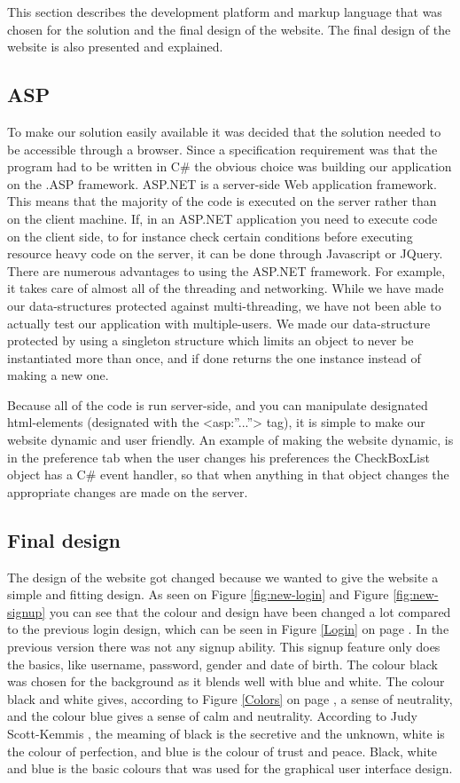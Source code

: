 This section describes the development platform and markup language that was chosen for the solution and the final design of the website. The final design of the website is also presented and explained.

\subsection{ASP}
To make our solution easily available it was decided that the solution needed to be accessible through a browser. Since a specification requirement was that the program had to be written in C\# the obvious choice was building our application on the .ASP framework. ASP.NET is a server-side Web application framework. This means that the majority of the code is executed on the server rather than on the client machine. If, in an ASP.NET application you need to execute code on the client side, to for instance check certain conditions before executing resource heavy code on the server, it can be done through Javascript or JQuery. There are numerous advantages to using the ASP.NET framework. For example, it takes care of almost all of the threading and networking. While we have made our data-structures protected against multi-threading, we have not been able to actually test our application with multiple-users. We made our data-structure protected by using a singleton structure which limits an object to never be instantiated more than once, and if done returns the one instance instead of making a new one.

Because all of the code is run server-side, and you can manipulate designated html-elements  (designated with the <asp:”...”> tag), it is simple to make our website dynamic and user friendly. An example of making the website dynamic, is in the preference tab when the user changes his preferences the CheckBoxList object has a C\# event handler, so that when anything in that object changes the appropriate changes are made on the server.

\subsection{Final design}
The design of the website got changed because we wanted to give the website a simple and fitting design. As seen on Figure \ref{fig:new-login} and Figure \ref{fig:new-signup} you can see that the colour and design have been changed a lot compared to the previous login design, which can be seen in Figure \ref{Login} on page \pageref{Login}. In the previous version there was not any signup ability. This signup feature only does the basics, like username, password, gender and date of birth. The colour black was chosen for the background as it blends well with blue and white. The colour black and white gives, according to Figure \ref{Colors} on page \pageref{Colors}, a sense of neutrality, and the colour blue gives a sense of calm and neutrality. According to Judy Scott-Kemmis \cite{EmpowerColor}, the meaming of black is the secretive and the unknown, white is the colour of perfection, and blue is the colour of trust and peace. Black, white and blue is the basic colours that was used for the graphical user interface design.


